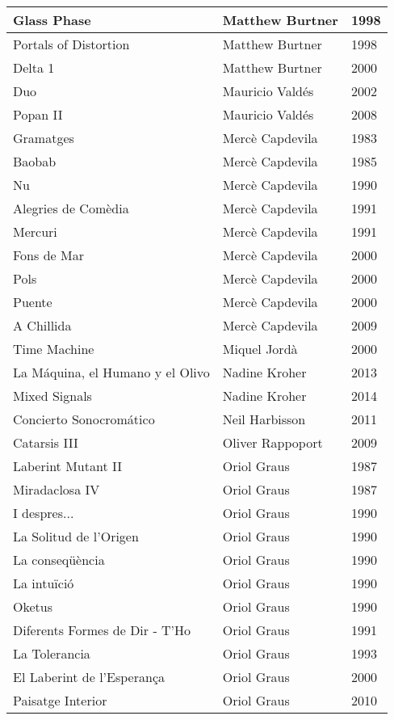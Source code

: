 \begin{center}
\begin{longtable}{| p{} | p{} | p{} |}
Glass Phase & Matthew Burtner & 1998 \\ \hline 
Portals of Distortion & Matthew Burtner & 1998 \\ \hline 
Delta 1 & Matthew Burtner & 2000 \\ \hline 
Duo & Mauricio Valdés & 2002 \\ \hline 
Popan II & Mauricio Valdés & 2008 \\ \hline 
Gramatges & Mercè Capdevila & 1983 \\ \hline 
Baobab & Mercè Capdevila & 1985 \\ \hline 
Nu & Mercè Capdevila & 1990 \\ \hline 
Alegries de Comèdia & Mercè Capdevila & 1991 \\ \hline 
Mercuri & Mercè Capdevila & 1991 \\ \hline 
Fons de Mar & Mercè Capdevila & 2000 \\ \hline 
Pols & Mercè Capdevila & 2000 \\ \hline 
Puente & Mercè Capdevila & 2000 \\ \hline 
A Chillida & Mercè Capdevila & 2009 \\ \hline 
Time Machine & Miquel Jordà & 2000 \\ \hline 
La Máquina, el Humano y el Olivo & Nadine Kroher & 2013 \\ \hline 
Mixed Signals & Nadine Kroher & 2014 \\ \hline 
Concierto Sonocromático & Neil Harbisson & 2011 \\ \hline 
Catarsis III & Oliver Rappoport & 2009 \\ \hline 
Laberint Mutant II & Oriol Graus & 1987 \\ \hline 
Miradaclosa IV & Oriol Graus & 1987 \\ \hline 
I despres... & Oriol Graus & 1990 \\ \hline 
La Solitud de l'Origen & Oriol Graus & 1990 \\ \hline 
La conseqüència & Oriol Graus & 1990 \\ \hline 
La intuïció & Oriol Graus & 1990 \\ \hline 
Oketus & Oriol Graus & 1990 \\ \hline 
Diferents Formes de Dir - T'Ho & Oriol Graus & 1991 \\ \hline 
La Tolerancia & Oriol Graus & 1993 \\ \hline 
El Laberint de l'Esperança & Oriol Graus & 2000 \\ \hline 
Paisatge Interior & Oriol Graus & 2010 \\ \hline 

\end{longtable}
\end{center}
